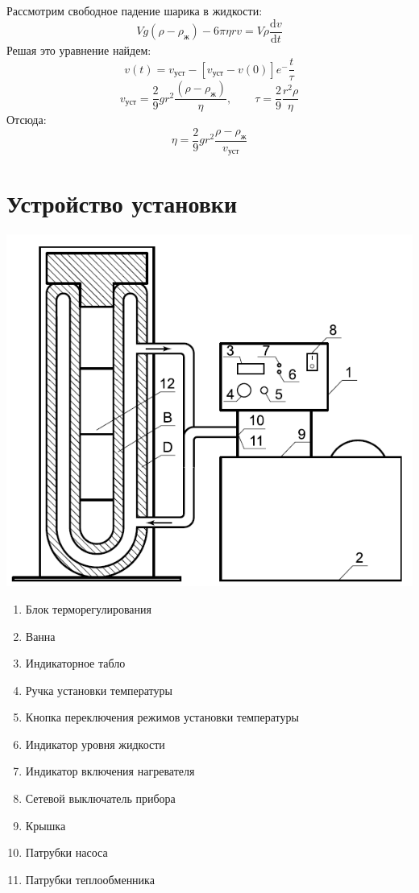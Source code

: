 \documentclass[a4paper,12pt]{article}
\newcommand{\dif}{\mathrm{d}}
\begin{document}
		Рассмотрим свободное падение шарика в жидкости:
		\begin{equation}
			Vg\left(\rho-\rho_{\text{ж}}\right) - 6\pi\eta rv = V\rho\frac{\dif v}{\dif t}
		\end{equation}
		Решая это уравнение найдем:
		\begin{equation}
			v(t)=v_{\text{уст}}-\left[v_{\text{уст}}-v(0)\right]e^-\frac{t}{\tau}
		\end{equation}
		\begin{equation}
			v_{\text{уст}} = \frac{2}{9}gr^2\frac{\left(\rho-\rho_{\text{ж}}\right)}{\eta}, \qquad \tau = \frac{2}{9}\frac{r^2\rho}{\eta}
		\end{equation}
		Отсюда:
		\begin{equation}
			\eta = \frac{2}{9}gr^2\frac{\rho - \rho_{\text{ж}}}{v_{\text{уст}}}
		\end{equation}
	\section{Устройство установки}
		\includegraphics[width = 0.5\linewidth]{instrument}
		\begin{enumerate}
			\item Блок терморегулирования
			\item Ванна
			\item Индикаторное табло
			\item Ручка установки температуры
			\item Кнопка переключения режимов установки температуры
			\item Индикатор уровня жидкости
			\item Индикатор включения нагревателя
			\item Сетевой выключатель прибора
			\item Крышка
			\item Патрубки насоса
			\item Патрубки теплообменника
		\end{enumerate}
	
\end{document}
